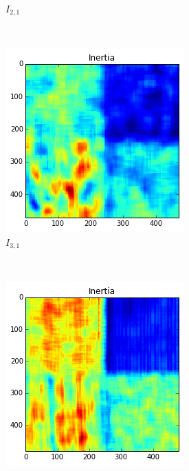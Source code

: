 \documentclass[a4paper]{article}
\begin{document}
\begin{figure}
\begin{subfigure}[b]{0.30\textwidth}
        \caption{%
            $I_{2,1}$
        }
        \label{fig:i21}
    \end{subfigure}
    ~
    \begin{subfigure}[b]{0.30\textwidth}
        \centering
        \includegraphics[width=\textwidth]{inertia31.png}
        \caption{%
            $I_{3,1}$
        }
        \label{fig:i31}
    \end{subfigure}
    \\
    \begin{subfigure}[b]{0.30\textwidth}
        \centering
        \includegraphics[width=\textwidth]{inertia12.png}

\end{subfigure}
\end{figure}
\end{document}
